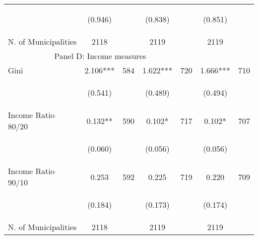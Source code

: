 \begin{tabular}{lcccccc}
\vspace{4pt} &  \begin{footnotesize}(0.946)\end{footnotesize}   & &
			    \begin{footnotesize}(0.838)\end{footnotesize}   & &
			    \begin{footnotesize}(0.851)\end{footnotesize}   &
			     \\

N. of Municipalities   &   2118   & &    2119 &    &  2119  &   \\
\hline	

\multicolumn{5}{c}{Panel D: Income measures} \\

Gini    &  2.106***   &  584  &   1.622***  &  720 &  1.666***  &  710   \\

\vspace{4pt} &  \begin{footnotesize}(0.541)\end{footnotesize}   & &
			    \begin{footnotesize}(0.489)\end{footnotesize}   & &
			    \begin{footnotesize}(0.494)\end{footnotesize}   &
			     \\          


Income Ratio 80/20     &  0.132**   &  590  &   0.102*  &  717 &  0.102*  &  707   \\

\vspace{4pt} &  \begin{footnotesize}(0.060)\end{footnotesize}   & &
			    \begin{footnotesize}(0.056)\end{footnotesize}   & &
			    \begin{footnotesize}(0.056)\end{footnotesize}   &
			     \\


Income Ratio 90/10     &  0.253   &  592  &   0.225  &  719 &  0.220  &  709   \\

\vspace{4pt} &  \begin{footnotesize}(0.184)\end{footnotesize}   & &
			    \begin{footnotesize}(0.173)\end{footnotesize}   & &
			    \begin{footnotesize}(0.174)\end{footnotesize}   &
			     \\


N. of Municipalities   &   2118   & &    2119 &    &  2119  &   \\
\hline	


\end{tabular}%
